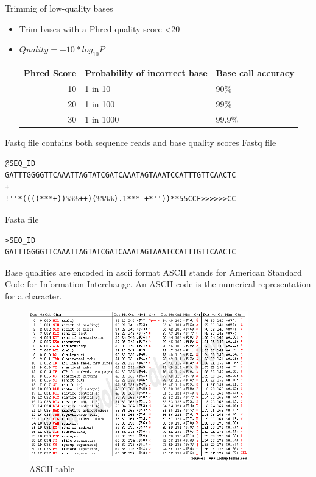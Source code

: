 \documentclass[presentation]{beamer}
\begin{document}
\begin{frame}[label=sec-2-1-5]{Trimmig of low-quality bases}
\begin{itemize}
\item Trim bases with a Phred quality score <20
\item \(Quality=-10*log_{10}{P}\)

\begin{center}
\begin{tabular}{rll}
Phred Score & Probability of incorrect base & Base call accuracy\\
\hline
10 & 1 in 10 & 90\%\\
20 & 1 in 100 & 99\%\\
30 & 1 in 1000 & 99.9\%\\
\end{tabular}
\end{center}
\end{itemize}
\end{frame}


\begin{frame}[fragile,label=sec-2-1-6]{Fastq file contains both sequence reads and base quality scores}
 \alert{Fastq file}

\begin{verbatim}
@SEQ_ID
GATTTGGGGTTCAAATTAGTATCGATCAAATAGTAAATCCATTTGTTCAACTC
+
!''*((((***+))%%%++)(%%%%).1***-+*''))**55CCF>>>>>>CC
\end{verbatim}


\alert{Fasta file}

\begin{verbatim}
>SEQ_ID
GATTTGGGGTTCAAATTAGTATCGATCAAATAGTAAATCCATTTGTTCAACTC
\end{verbatim}
\end{frame}


\begin{frame}[label=sec-2-1-7]{Base qualities are encoded in ascii format}
ASCII stands for American Standard Code for Information
Interchange. An ASCII code is the numerical representation for a
character.
\begin{figure}[htb]
\centering
\includegraphics[width=9.5cm]{asciifull.png}
\caption{ASCII table}
\end{figure}
\end{frame}
\end{document}
